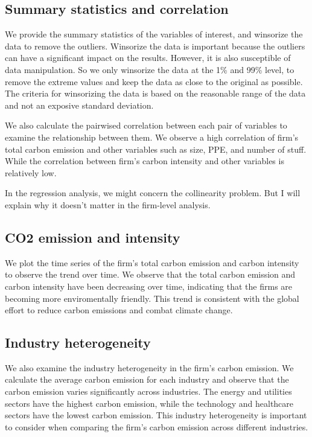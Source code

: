 \documentclass[12pt]{article}
\begin{document}
\subsection{Summary statistics and correlation}
We provide the summary statistics of the variables of interest, and winsorize the data to remove the outliers. Winsorize the data is important because the outliers can have a significant impact on the results. However, it is also susceptible of data manipulation. So we only winsorize the data at the 1\% and 99\% level, to remove the extreme values and keep the data as close to the original as possible. The criteria for winsorizing the data is based on the reasonable range of the data and not an exposive standard deviation.

We also calculate the pairwised correlation between each pair of variables to examine the relationship between them. We observe a high correlation of firm's total carbon emission and other variables such as size, PPE, and number of stuff. While the correlation between firm's carbon intensity and other variables is relatively low.

In the regression analysis, we might concern the collinearity problem. But I will explain why it doesn't matter in the firm-level analysis.

\subsection{CO2 emission and intensity}
We plot the time series of the firm's total carbon emission and carbon intensity to observe the trend over time. We observe that the total carbon emission and carbon intensity have been decreasing over time, indicating that the firms are becoming more enviromentally friendly. This trend is consistent with the global effort to reduce carbon emissions and combat climate change.

\subsection{Industry heterogeneity}
We also examine the industry heterogeneity in the firm's carbon emission. We calculate the average carbon emission for each industry and observe that the carbon emission varies significantly across industries. The energy and utilities sectors have the highest carbon emission, while the technology and healthcare sectors have the lowest carbon emission. This industry heterogeneity is important to consider when comparing the firm's carbon emission across different industries.
\end{document}
